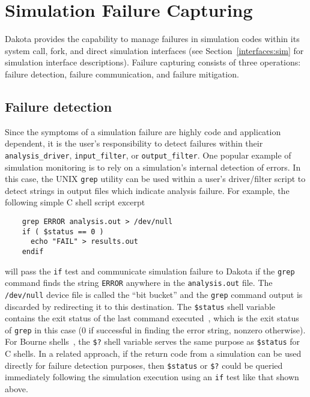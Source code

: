 \chapter{Simulation Failure Capturing}\label{failure}

Dakota provides the capability to manage failures in simulation codes
within its system call, fork, and direct simulation interfaces (see
Section~\ref{interfaces:sim} for simulation interface descriptions).
Failure capturing consists of three operations: failure detection,
failure communication, and failure mitigation.

\section{Failure detection}\label{failure:detection}

Since the symptoms of a simulation failure are highly code and
application dependent, it is the user's responsibility to detect
failures within their \texttt{analysis\_driver},
\texttt{input\_filter}, or \texttt{output\_filter}. One popular 
example of simulation monitoring is to rely on a simulation's internal
detection of errors.  In this case, the UNIX \texttt{grep} utility can
be used within a user's driver/filter script to detect strings in
output files which indicate analysis failure. For example, the
following simple C shell script excerpt
\begin{verbatim}
    grep ERROR analysis.out > /dev/null
    if ( $status == 0 )
      echo "FAIL" > results.out
    endif
\end{verbatim}

will pass the \texttt{if} test and communicate simulation failure to
Dakota if the \texttt{grep} command finds the string \texttt{ERROR}
anywhere in the \texttt{analysis.out} file. The \texttt{/dev/null}
device file is called the ``bit bucket'' and the \texttt{grep} command
output is discarded by redirecting it to this destination. The
\texttt{\$status} shell variable contains the exit status of the last
command executed~\cite{And86}, which is the exit status of \texttt{grep}
in this case (0 if successful in finding the error string, nonzero
otherwise). For Bourne shells~\cite{Bli96}, the \texttt{\$?} shell
variable serves the same purpose as \texttt{\$status} for C shells. In
a related approach, if the return code from a simulation can be used
directly for failure detection purposes, then \texttt{\$status} or
\texttt{\$?} could be queried immediately following the simulation
execution using an \texttt{if} test like that shown above.


